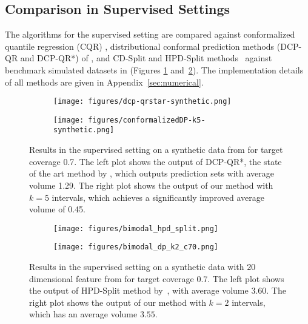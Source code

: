\subsection{Comparison in Supervised Settings}

The algorithms for the supervised setting are compared against conformalized quantile regression (CQR)  \citep{romano2019conformalized},  distributional conformal prediction methods (DCP-QR and DCP-QR*) of \citet{chernozhukov2021distributional}, and CD-Split and HPD-Split methods~\citep{izbicki2022cd} against benchmark simulated datasets in \citet{romano2019conformalized, izbicki2020flexible} (Figures \ref{fig:intro:labeled} and~\ref{fig:exp:bimodal}). The implementation details of all methods are given in Appendix~\ref{sec:numerical}. 
\begin{figure}[H]
    \centering
    \begin{subfigure}{0.48\columnwidth}
        \texttt{[image: figures/dcp-qrstar-synthetic.png]}
    \end{subfigure}
    \hfill
    \begin{subfigure}{0.48\columnwidth}
        \texttt{[image: figures/conformalizedDP-k5-synthetic.png]}
    \end{subfigure}
    \caption{Results in the supervised setting on a synthetic data from \citet{romano2019conformalized} for target coverage 0.7.  The left plot shows the output of DCP-QR*, the state of the art method by \citet{chernozhukov2021distributional}, which outputs prediction sets with average volume 1.29.  The right plot shows the output of our method with \(k = 5\) intervals, which achieves a significantly improved average volume of 0.45. }
    \label{fig:intro:labeled}
\end{figure}

\begin{figure}[H]
    \centering
    \begin{subfigure}{0.48\columnwidth}
        \texttt{[image: figures/bimodal\_hpd\_split.png]}
    \end{subfigure}
    \hfill
    \begin{subfigure}{0.48\columnwidth}
        \texttt{[image: figures/bimodal\_dp\_k2\_c70.png]}
    \end{subfigure}
    \caption{Results in the supervised setting on a synthetic data with $20$ dimensional feature from \citet{izbicki2020flexible} for target coverage 0.7. The left plot shows the output of HPD-Split method by~\citet{izbicki2022cd}, with average volume $3.60$. The right plot shows the output of our method with $k=2$ intervals, which has an average volume $3.55$.}
    \label{fig:exp:bimodal}
\end{figure}

